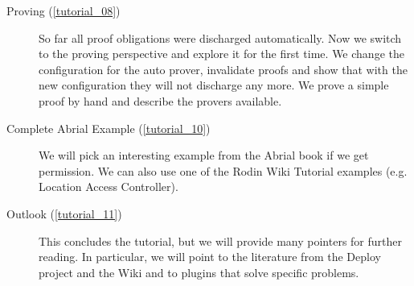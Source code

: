 \begin{description}
	\item[Proving (\ref{tutorial_08})] So far all proof obligations were discharged automatically.  Now we switch to the proving perspective and explore it for the first time.
We change the configuration for the auto prover, invalidate proofs and show that with the new configuration they will not discharge any more.  We prove a simple proof by hand and describe the provers available.
	\item[Complete Abrial Example (\ref{tutorial_10})] We will pick an interesting example from the Abrial book if we get permission.  We can also use one of the Rodin Wiki Tutorial examples (e.g. Location Access Controller).
	\item[Outlook (\ref{tutorial_11})] This concludes the tutorial, but we will provide many pointers for further reading.  In particular, we will point to the literature from the Deploy project and the Wiki and to plugins that solve specific problems.
\end{description}

